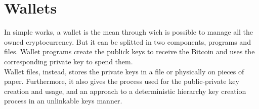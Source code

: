 \section{Wallets}
\label{sec:wallets}
In simple works, a wallet is the mean through wich is possible to manage all the 
owned cryptocurrency. But it can be splitted in two components, programs and files.
Wallet programs create the publick keys to receive the Bitcoin and uses the 
corresponding private key to spend them.\\ 
Wallet files, instead, stores the private keys in a file or physically on pieces of paper. 
Furthermore, it also gives the process used for the public-private key creation and 
usage, and  an approach to a deterministic hierarchy key creation process in an unlinkable
keys manner.


